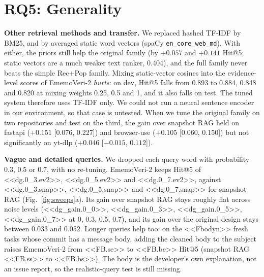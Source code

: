 \documentclass[conference]{IEEEtran}
\newcommand{\sys}{EmemoVeri}
\begin{document}
\section{RQ5: Generality}
\label{sec:general}
\textbf{Other retrieval methods and transfer.} We replaced hashed TF-IDF by BM25, and by averaged static word vectors (spaCy \texttt{en\_core\_web\_md}). With either, the priors still help the original family (by $+0.057$ and $+0.141$ Hit@5; static vectors are a much weaker text ranker, 0.404), and the full family never beats the simple Rec+Pop family. Mixing static-vector cosines into the evidence-level scores of \sys{}-2 \emph{hurts}: on dev, Hit@5 falls from 0.893 to 0.884, 0.848 and 0.820 at mixing weights 0.25, 0.5 and 1, and it also falls on test. The tuned system therefore uses TF-IDF only. We could not run a neural sentence encoder in our environment, so that case is untested. When we tune the original family on two repositories and test on the third, the gain over snapshot RAG held on fastapi ($+0.151$ [0.076, 0.227]) and browser-use ($+0.105$ [0.060, 0.150]) but not significantly on yt-dlp ($+0.046$ [$-0.015$, $0.112$]).

\textbf{Vague and detailed queries.} We dropped each query word with probability 0.3, 0.5 or 0.7, with no re-tuning. \sys{}-2 keeps Hit@5 of <<dg.0_3.ev2>>, <<dg.0_5.ev2>> and <<dg.0_7.ev2>>, against <<dg.0_3.snap>>, <<dg.0_5.snap>> and <<dg.0_7.snap>> for snapshot RAG (Fig.~\ref{fig:sweeps}a). Its gain over snapshot RAG stays roughly flat across noise levels (<<dg_gain.0_0>>, <<dg_gain.0_3>>, <<dg_gain.0_5>>, <<dg_gain.0_7>> at 0, 0.3, 0.5, 0.7), and its gain over the original design stays between 0.033 and 0.052. Longer queries help too: on the <<Fbodyn>> fresh tasks whose commit has a message body, adding the cleaned body to the subject raises \sys{}-2 from <<FB.se>> to <<FB.be>> Hit@5 (snapshot RAG <<FB.ss>> to <<FB.bs>>). The body is the developer's own explanation, not an issue report, so the realistic-query test is still missing.
\end{document}
